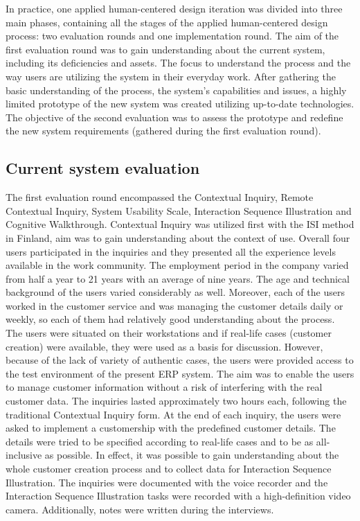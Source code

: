 \documentclass[12pt,a4paper,oneside,pdftex]{report}
\begin{document}
In practice, one applied human-centered design iteration was divided into three main phases, containing all the stages of the applied human-centered design process: two evaluation rounds and one implementation round. The aim of the first evaluation round was to gain understanding about the current system, including its deficiencies and assets. The focus to understand the process and the way users are utilizing the system in their everyday work. After gathering the basic understanding of the process, the system's capabilities and issues, a highly limited prototype of the new system was created utilizing up-to-date technologies. The objective of the second evaluation was to assess the prototype and redefine the new system requirements (gathered during the first evaluation round). 

\subsection{Current system evaluation}
\label{sec:firstiteration}

The first evaluation round encompassed the Contextual Inquiry, Remote Contextual Inquiry, System Usability Scale, Interaction Sequence Illustration and Cognitive Walkthrough. Contextual Inquiry was utilized first with the ISI method in Finland, aim was to gain understanding about the context of use. Overall four users participated in the inquiries and they presented all the experience levels available in the work community. The employment period in the company varied from half a year to 21 years with an average of nine years. The age and technical background of the users varied considerably as well. Moreover, each of the users worked in the customer service and was managing the customer details daily or weekly, so each of them had relatively good understanding about the process. The users were situated on their workstations and if real-life cases (customer creation) were available, they were used as a basis for discussion. However, because of the lack of variety of authentic cases, the users were provided access to the test environment of the present ERP system. The aim was to enable the users to manage customer information without a risk of interfering with the real customer data. The inquiries lasted approximately two hours each, following  the traditional Contextual Inquiry form. At the end of each inquiry, the users were asked to implement a customership with the predefined customer details. The details were tried to be specified according to real-life cases and to be as all-inclusive as possible. In effect, it was possible to gain understanding about the whole customer creation process and to collect data for Interaction Sequence Illustration. The inquiries were documented with the voice recorder and the Interaction Sequence Illustration tasks were recorded with a high-definition video camera. Additionally, notes were written during the interviews.
\end{document}
